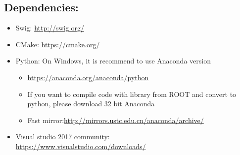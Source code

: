 \documentclass{article}
\begin{document}
    \subsection{ Dependencies:}
        \begin{itemize}
            \item Swig: \url{http://swig.org/}
            \item CMake: \url{https://cmake.org/}
            \item Python: On  Windows, it is recommend to use Anaconda version
                
            \begin{itemize}
                \item \url{https://anaconda.org/anaconda/python}
                \item If you want to compile code with library from ROOT and convert to python, please download 32 bit Anaconda
                \item Fast mirror:\url{http://mirrors.ustc.edu.cn/anaconda/archive/}
            \end{itemize}
                
            \item Visual studio 2017 community: \\
            \url{https://www.visualstudio.com/downloads/}
            
        \end{itemize}
\end{document}
